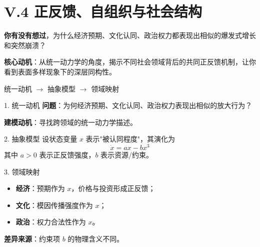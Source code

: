 \documentclass[../main.tex]{subfiles}
\begin{document}
\chapter{V.4 正反馈、自组织与社会结构}
\label{math:selforg}

\begin{motivation}
	\textbf{你有没有想过}，为什么经济预期、文化认同、政治权力都表现出相似的爆发式增长和突然崩溃？

	\textbf{核心动机}：从统一动力学的角度，揭示不同社会领域背后的共同正反馈机制，让你看到表面多样现象下的深层同构性。
\end{motivation}

\begin{logicmap}
	统一动机 $\rightarrow$ 抽象模型 $\rightarrow$ 领域映射
\end{logicmap}


\begin{mathbox}{1. 统一动机}
	\textbf{问题}：为何经济预期、文化认同、政治权力表现出相似的放大行为？
	
	\textbf{建模动机}：寻找跨领域的统一动力学描述。
\end{mathbox}

\begin{mathbox}{2. 抽象模型}
	设状态变量 $x$ 表示"被认同程度"，其演化为
	\[ \dot{x} = ax - bx^3 \]
	其中 $a>0$ 表示正反馈强度，$b$ 表示资源/约束。
\end{mathbox}

\begin{mathbox}{3. 领域映射}
	\begin{itemize}
		\item \textbf{经济}：预期作为 $x$，价格与投资形成正反馈；
		\item \textbf{文化}：模因传播强度作为 $x$；
		\item \textbf{政治}：权力合法性作为 $x$。
	\end{itemize}
	
	\textbf{差异来源}：约束项 $b$ 的物理含义不同。
\end{mathbox}
\end{document}
